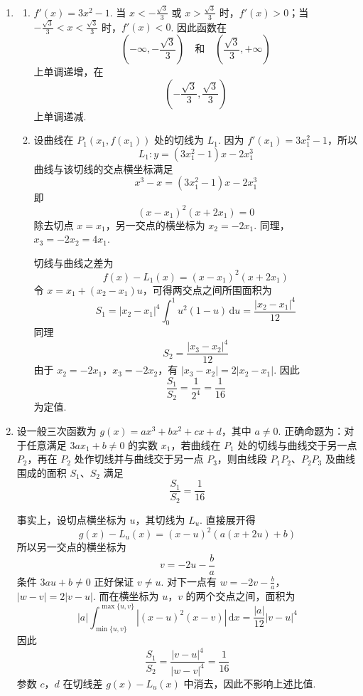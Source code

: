 \begin{solution}
\begin{enumerate}
\item
\begin{enumerate}
\item \(f'(x)=3x^{2}-1\). 当 \(x<-\frac{\sqrt3}{3}\) 或 \(x>\frac{\sqrt3}{3}\) 时，\(f'(x)>0\)；当 \(-\frac{\sqrt3}{3}<x<\frac{\sqrt3}{3}\) 时，\(f'(x)<0\). 因此函数在
\[
\left(-\infty,-\frac{\sqrt3}{3}\right)\quad\text{和}\quad\left(\frac{\sqrt3}{3},+\infty\right)
\]
上单调递增，在
\[
\left(-\frac{\sqrt3}{3},\frac{\sqrt3}{3}\right)
\]
上单调递减.

\item 设曲线在 \(P_{1}(x_{1},f(x_{1}))\) 处的切线为 \(L_{1}\). 因为 \(f'(x_{1})=3x_{1}^{2}-1\)，所以
\[
L_{1}:y=(3x_{1}^{2}-1)x-2x_{1}^{3}
\]
曲线与该切线的交点横坐标满足
\[
x^{3}-x=(3x_{1}^{2}-1)x-2x_{1}^{3}
\]
即
\[
(x-x_{1})^{2}(x+2x_{1})=0
\]
除去切点 \(x=x_{1}\)，另一交点的横坐标为 \(x_{2}=-2x_{1}\). 同理，\(x_{3}=-2x_{2}=4x_{1}\).

切线与曲线之差为
\[
f(x)-L_{1}(x)=(x-x_{1})^{2}(x+2x_{1})
\]
令 \(x=x_{1}+(x_{2}-x_{1})u\)，可得两交点之间所围面积为
\[
S_{1}=|x_{2}-x_{1}|^{4}\int_{0}^{1}u^{2}(1-u)\,\mathrm du
=\frac{|x_{2}-x_{1}|^{4}}{12}
\]
同理
\[
S_{2}=\frac{|x_{3}-x_{2}|^{4}}{12}
\]
由于 \(x_{2}=-2x_{1}\)，\(x_{3}=-2x_{2}\)，有 \(|x_{3}-x_{2}|=2|x_{2}-x_{1}|\). 因此
\[
\frac{S_{1}}{S_{2}}=\frac{1}{2^{4}}=\frac{1}{16}
\]
为定值.
\end{enumerate}
\item 设一般三次函数为 \(g(x)=ax^{3}+bx^{2}+cx+d\)，其中 \(a\neq0\). 正确命题为：对于任意满足 \(3ax_{1}+b\neq0\) 的实数 \(x_{1}\)，若曲线在 \(P_{1}\) 处的切线与曲线交于另一点 \(P_{2}\)，再在 \(P_{2}\) 处作切线并与曲线交于另一点 \(P_{3}\)，则由线段 \(P_{1}P_{2}\)、\(P_{2}P_{3}\) 及曲线围成的面积 \(S_{1}\)、\(S_{2}\) 满足
\[
\frac{S_{1}}{S_{2}}=\frac{1}{16}
\]

事实上，设切点横坐标为 \(u\)，其切线为 \(L_{u}\). 直接展开得
\[
g(x)-L_{u}(x)=(x-u)^{2}\left(a(x+2u)+b\right)
\]
所以另一交点的横坐标为
\[
v=-2u-\frac{b}{a}
\]
条件 \(3au+b\neq0\) 正好保证 \(v\neq u\). 对下一点有
\(w=-2v-\frac{b}{a}\)，\(|w-v|=2|v-u|\).
而在横坐标为 \(u\)，\(v\) 的两个交点之间，面积为
\[
|a|\int_{\min\{u,v\}}^{\max\{u,v\}}|(x-u)^{2}(x-v)|\,\mathrm dx
=\frac{|a|}{12}|v-u|^{4}
\]
因此
\[
\frac{S_{1}}{S_{2}}=\frac{|v-u|^{4}}{|w-v|^{4}}=\frac{1}{16}
\]
参数 \(c\)，\(d\) 在切线差 \(g(x)-L_u(x)\) 中消去，因此不影响上述比值.
\end{enumerate}
\end{solution}


